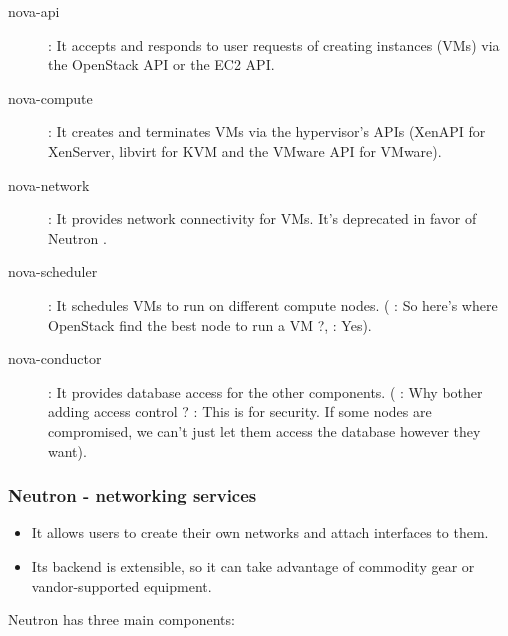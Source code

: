 \documentclass[dvipsnames]{article}
\begin{document}
\begin{description}
\item[nova-api] : It accepts and responds to user requests of creating instances
  (VMs) via the OpenStack API or the EC2 API.
\item[nova-compute] : It creates and terminates VMs via the hypervisor's APIs
  (XenAPI for XenServer, libvirt for KVM and the VMware API for VMware).
\item[nova-network] : It provides network connectivity for VMs. It's deprecated
  in favor of Neutron .
\item[nova-scheduler] : It schedules VMs to run on different compute nodes.
  ( : So here's where OpenStack find the best node to run a VM ?,
   : Yes).
\item[nova-conductor] : It provides database access for the other components.
  ( : Why bother adding access control ?  : This is
  for security. If some nodes are compromised, we can't just let them access the
  database however they want).
\end{description}

\subsubsection{Neutron - networking services}




\begin{itemize}
\item It allows users to create their own networks and attach interfaces to them.
\item Its backend is extensible, so it can take advantage of commodity gear or
  vandor-supported equipment.
\end{itemize}

Neutron has three main components:
\end{document}
